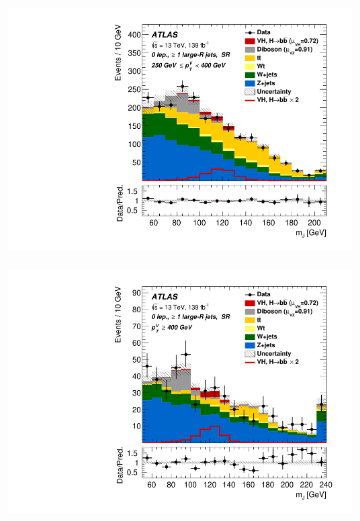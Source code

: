 \begin{figure}[!htbp]
  \centering
  \begin{subfigure}{.4\textwidth}
    \includegraphics[width=\textwidth]{chapters/6.vhbb_boosted/figs/Region_BMin250_BMax400_incFat1_Fat1_Y6051_DSRnoaddbjetsr_T2_L0_distmBB_GlobalFit_unconditionnal_mu1.pdf}
  \end{subfigure}%
  \begin{subfigure}{.4\textwidth}
    \includegraphics[width=\textwidth]{chapters/6.vhbb_boosted/figs/Region_BMin400_incFat1_Fat1_Y6051_DSRnoaddbjetsr_T2_L0_distmBB_GlobalFit_unconditionnal_mu1.pdf}
  \end{subfigure}
  \begin{subfigure}{.4\textwidth}

\end{subfigure}
\end{figure}
